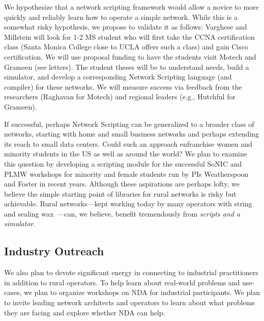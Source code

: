 We hypothesize that a network scripting framework would allow a novice to more quickly and reliably learn how to operate a simple network. While this is a somewhat risky hypothesis, we propose to validate it as follows: Varghese and Millstein will look for 1-2 MS student who will first take the CCNA certification class (Santa Monica College close to UCLA offers such a class) and gain Cisco certification.  We will use proposal funding to have the students visit Motech and Grameen (see letters).  The student theses will be to understand needs, build a simulator, and develop a corresponding Network Scripting language (and compiler) for these networks.  We will measure success via feedback from the researchers (Raghavan for Motech) and regional leaders (e.g., Hutchful for Grameen).

If successful, perhaps Network Scripting can be generalized to a broader class of networks, starting with home and small business networks and perhaps extending its reach to small data centers.  Could such an approach enfranchise women and minority students in the US as well as around the world?  We plan to examine this question by developing a scripting module for the successful SoNIC and PLMW workshops for minority and female students run by PIs Weatherspoon and Foster in recent years. Although these aspirations are perhaps lofty, we believe the simple starting point of libraries for rural networks is risky but achievable.  Rural networks---kept working today by many operators with string and sealing wax~\cite{barath}---can, we believe, benefit tremendously from {\em scripts and a simulator}.  


\subsection*{Industry Outreach}

We also plan to devote significant energy in connecting to industrial
practitioners in addition to rural operators. To help learn about real-world problems and use-cases,
we plan to organize workshops on NDA for industrial participants. We
plan to invite leading network architects and operators to learn about
what problems they are facing and explore whether NDA can help. 
